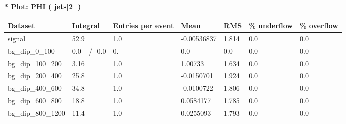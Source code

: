 \documentclass[a4paper, 10pt]{article}
\begin{document}
\textbf{* Plot: PHI ( jets[2] ) }\\
   \begin{table}[H]
  \begin{center}
    \begin{tabular}{|m{23.0mm}|m{23.0mm}|m{18.0mm}|m{19.0mm}|m{19.0mm}|m{19.0mm}|m{19.0mm}|}
      \hline
      {\cellcolor{yellow}         Dataset}& {\cellcolor{yellow}         Integral}& {\cellcolor{yellow}         Entries per event}& {\cellcolor{yellow}         Mean}& {\cellcolor{yellow}         RMS}& {\cellcolor{yellow}         \% underflow}& {\cellcolor{yellow}         \% overflow}\\
      \hline
      {\cellcolor{white}         signal}& {\cellcolor{white}         52.9}& {\cellcolor{white}         1.0}& {\cellcolor{white}         -0.00536837}& {\cellcolor{white}         1.814}& {\cellcolor{green}         0.0}& {\cellcolor{green}         0.0}\\
      \hline
      {\cellcolor{white}         bg\_dip\_0\_100}& {\cellcolor{white}         0.0 +/\-- 0.0}& {\cellcolor{white}         0.}& {\cellcolor{white}         0.0}& {\cellcolor{white}         0.0}& {\cellcolor{green}         0.0}& {\cellcolor{green}         0.0}\\
      \hline
      {\cellcolor{white}         bg\_dip\_100\_200}& {\cellcolor{white}         3.16}& {\cellcolor{white}         1.0}& {\cellcolor{white}         1.00733}& {\cellcolor{white}         1.634}& {\cellcolor{green}         0.0}& {\cellcolor{green}         0.0}\\
      \hline
      {\cellcolor{white}         bg\_dip\_200\_400}& {\cellcolor{white}         25.8}& {\cellcolor{white}         1.0}& {\cellcolor{white}         -0.0150701}& {\cellcolor{white}         1.924}& {\cellcolor{green}         0.0}& {\cellcolor{green}         0.0}\\
      \hline
      {\cellcolor{white}         bg\_dip\_400\_600}& {\cellcolor{white}         34.8}& {\cellcolor{white}         1.0}& {\cellcolor{white}         -0.0100722}& {\cellcolor{white}         1.806}& {\cellcolor{green}         0.0}& {\cellcolor{green}         0.0}\\
      \hline
      {\cellcolor{white}         bg\_dip\_600\_800}& {\cellcolor{white}         18.8}& {\cellcolor{white}         1.0}& {\cellcolor{white}         0.0584177}& {\cellcolor{white}         1.785}& {\cellcolor{green}         0.0}& {\cellcolor{green}         0.0}\\
      \hline
      {\cellcolor{white}         bg\_dip\_800\_1200}& {\cellcolor{white}         11.4}& {\cellcolor{white}         1.0}& {\cellcolor{white}         0.0255093}& {\cellcolor{white}         1.793}& {\cellcolor{green}         0.0}& {\cellcolor{green}         0.0}\\

\end{tabular}
\end{center}
\end{table}
\end{document}
